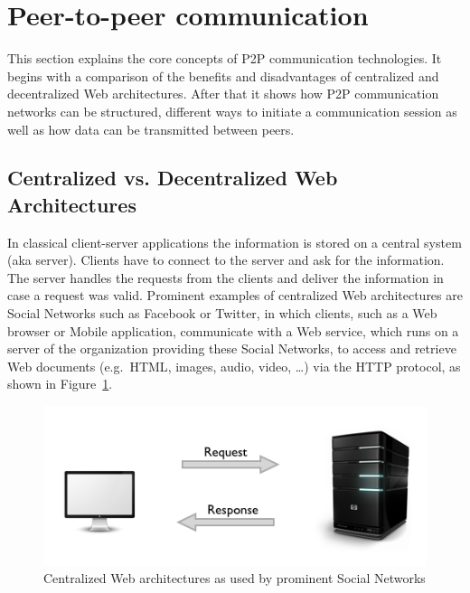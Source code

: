 
\section{Peer-to-peer communication}
\label{sec:p2p_communication}

This section explains the core concepts of \gls{P2P} communication technologies. It begins with a comparison of the benefits and disadvantages of centralized and decentralized Web architectures. After that it shows how \gls{P2P} communication networks can be structured, different ways to initiate a communication session as well as how data can be transmitted between peers.

\subsection{Centralized vs. Decentralized Web Architectures}
\label{sec:central_decentral_arch}

In classical client-server applications the information is stored on a central system (aka server). Clients have to connect to the server and ask for the information. The server handles the requests from the clients and deliver the information in case a request was valid. Prominent examples of centralized Web architectures are Social Networks such as Facebook or Twitter, in which clients, such as a Web browser or Mobile application, communicate with a Web service, which runs on a server of the organization providing these Social Networks, to access and retrieve Web documents (e.g.\ \gls{HTML}, images, audio, video, \ldots) via the \gls{HTTP} protocol, as shown in Figure~\ref{fig:p2p_central_server}. \@

\begin{figure}[H]
	\centering
		\includegraphics[width=0.9\columnwidth]{images/client-server-web.png}
	\caption[Centralized Web architectures as used by prominent Social Networks]{Centralized Web architectures as used by prominent Social Networks \citep{codeTuts}}
\label{fig:p2p_central_server}
\end{figure}

